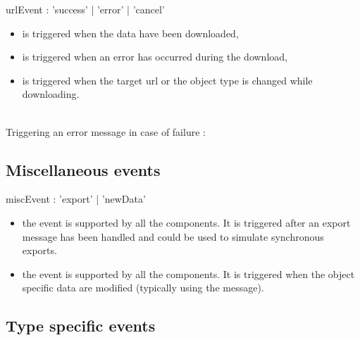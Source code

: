 \documentclass[a4paper,twoside]{report}
\newcommand{\subsublevel}[1]	{\subsection{#1}}
\begin{document}

\begin{rail}
urlEvent : 	'success'  
		| 'error'
		| 'cancel'
\end{rail}

\begin{itemize}
\item {} is triggered when the data have been downloaded,
\item {} is triggered when an error has occurred during the download,
\item {} is triggered when the target url or the object type is changed while downloading.
\end{itemize}

\example \\
Triggering an error message in case of failure :


\subsublevel{Miscellaneous events}
\label{miscevents}


\begin{rail}
miscEvent : 	  'export'
		| 'newData'
\end{rail}

\begin{itemize}
\item the  event is supported by all the components. It is triggered after an export message has been handled and could be used to simulate synchronous exports.
\item the  event is supported by all the components. It is triggered when the object specific data are modified (typically using the  message).
\end{itemize}


\subsublevel{Type specific events}
\label{typespecevents}

\end{document}
